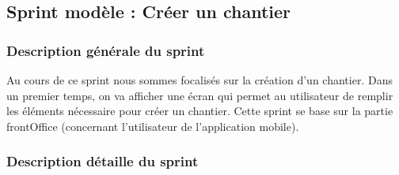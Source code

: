 \subsection{Sprint mod\`ele : Cr\'eer un chantier}

\subsubsection{Description g\'en\'erale du sprint}

Au cours de ce sprint nous sommes focalis\'es sur la cr\'eation d'un chantier. Dans un premier temps, on va afficher une \'ecran qui permet au utilisateur de remplir les \'el\'ements n\'ecessaire pour cr\'eer un chantier. Cette sprint se base sur la partie frontOffice (concernant l'utilisateur de l'application mobile).

\subsubsection{Description d\'etaille du sprint}

